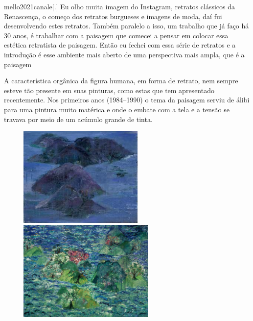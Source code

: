 \begin{displaycquote}{mello2021canale}[.]
	Eu olho muita imagem do Instagram, retratos clássicos da Renascença, o
	começo dos retratos burgueses e imagens de moda, daí fui desenvolvendo
	estes retratos. Também paralelo a isso, um trabalho que já faço há 30
	anos, é trabalhar com a paisagem que comecei a pensar em colocar essa
	estética retratista de paisagem. Então eu fechei com essa série de
	retratos e a introdução é esse ambiente mais aberto de uma perspectiva
	mais ampla, que é a paisagem
\end{displaycquote}

A característica orgânica da figura humana, em forma de retrato, nem
sempre esteve tão presente em suas pinturas, como estas que tem
apresentado recentemente. Nos primeiros anos (1984--1990) o tema da
paisagem serviu de álibi para uma pintura muito matérica e onde o
embate com a tela e a tensão se travava por meio de um acúmulo grande
de tinta.

\begin{figure}[b]
	\begin{minipage}{.45\linewidth}
		\caption{}
		\includegraphics[width=2.42898in,height=1.95536in]{figuras/canale-arquipelago-1990.pdf.compressed.pdf}

	\end{minipage}
	\begin{minipage}{.45\linewidth}
		\caption{}
		\includegraphics[width=2.6407in,height=1.95427in]{figuras/canale-new-age-1991.pdf.compressed.pdf}
	\end{minipage}
\end{figure}
\clearpage

